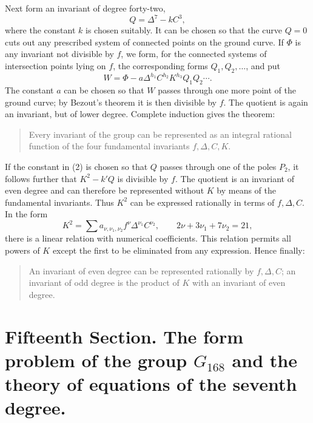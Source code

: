 \documentclass[11pt]{article}
\begin{document}
Next form an invariant of degree forty-two,
\begin{equation}
Q=\Delta^7-kC^3,
\tag{2}
\end{equation}
where the constant \(k\) is chosen suitably. It can be chosen so that the curve \(Q=0\) cuts out any prescribed system of connected points on the ground curve. If \(\Phi\) is any invariant not divisible by \(f\), we form, for the connected systems of intersection points lying on \(f\), the corresponding forms \(Q_1,Q_2,\ldots\), and put
\begin{equation}
W=\Phi-a\Delta^{h_1}C^{h_2}K^{h_3}Q_1Q_2\cdots.
\end{equation}
The constant \(a\) can be chosen so that \(W\) passes through one more point of the ground curve; by Bezout's theorem it is then divisible by \(f\). The quotient is again an invariant, but of lower degree. Complete induction gives the theorem:
\begin{quote}
Every invariant of the group can be represented as an integral rational function of the four fundamental invariants \(f,\Delta,C,K\).
\end{quote}

If the constant in (2) is chosen so that \(Q\) passes through one of the poles \(P_2\), it follows further that \(K^2-k'Q\) is divisible by \(f\). The quotient is an invariant of even degree and can therefore be represented without \(K\) by means of the fundamental invariants. Thus \(K^2\) can be expressed rationally in terms of \(f,\Delta,C\). In the form
\begin{equation}
K^2=\sum a_{\nu,\nu_1,\nu_2} f^\nu\Delta^{\nu_1}C^{\nu_2},
\qquad
2\nu+3\nu_1+7\nu_2=21,
\tag{3}
\end{equation}
there is a linear relation with numerical coefficients. This relation permits all powers of \(K\) except the first to be eliminated from any expression. Hence finally:
\begin{quote}
An invariant of even degree can be represented rationally by \(f,\Delta,C\); an invariant of odd degree is the product of \(K\) with an invariant of even degree.
\end{quote}


\clearpage



\section*{Fifteenth Section. The form problem of the group \(G_{168}\) and the theory of equations of the seventh degree.}
\end{document}
